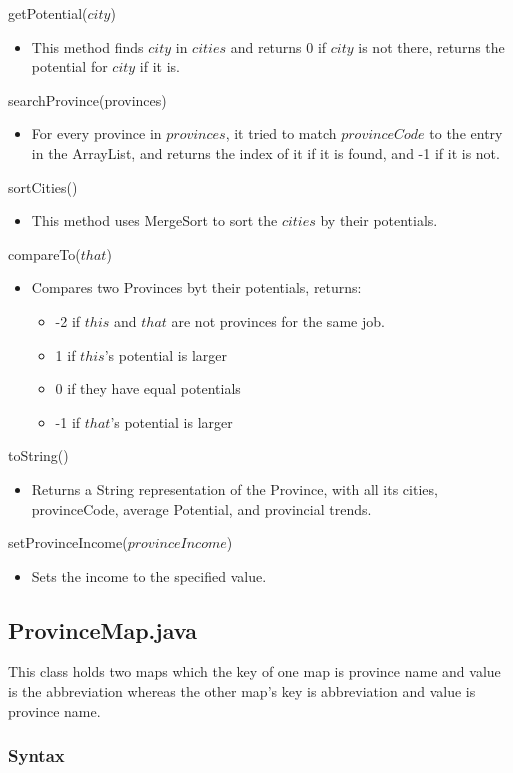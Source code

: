 \documentclass[12pt,fleqn]{article}
\begin{document}
\noindent getPotential($city$)
\begin{itemize}
\item This method finds $city$ in $cities$ and returns 0 if $city$ is not there, returns the potential for $city$ if it is.
\end{itemize}
\noindent searchProvince(provinces)
\begin{itemize}
\item For every province in $provinces$, it tried to match $provinceCode$ to the entry in the ArrayList, and returns the index of it if it is found, and -1 if it is not.
\end{itemize}
\noindent sortCities()
\begin{itemize}
\item This method uses MergeSort to sort the $cities$ by their potentials.
\end{itemize}
\noindent compareTo($that$)
\begin{itemize}
\item Compares two Provinces byt their potentials, returns:
\begin{itemize}
\item -2 if $this$ and $that$ are not provinces for the same job.
\item 1 if $this$'s potential is larger
\item 0 if they have equal potentials
\item -1 if $that$'s potential is larger
\end{itemize}
\end{itemize}
\noindent toString()
\begin{itemize}
\item Returns a String representation of the Province, with all its cities, provinceCode, average Potential, and provincial trends.
\end{itemize}
\noindent setProvinceIncome($provinceIncome$)
\begin{itemize}
\item Sets the income to the specified value.
\end{itemize}


\subsection*{ProvinceMap.java}\label{provmap}
This class holds two maps which the key of one map is province name and value is the abbreviation
whereas the other map’s key is abbreviation and value is province name.
\subsubsection* {Syntax}
\end{document}
